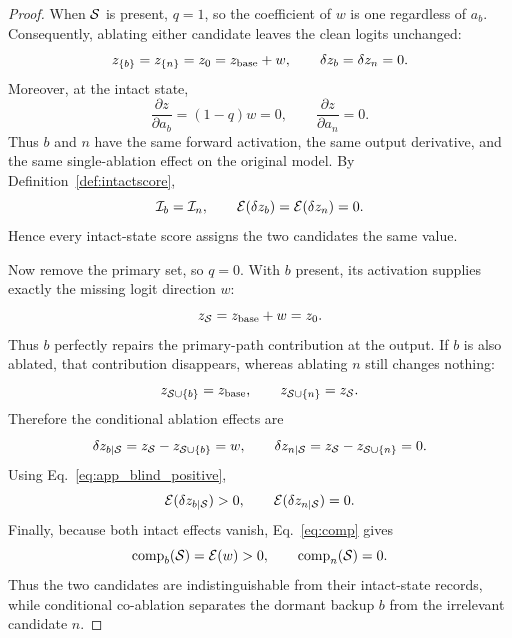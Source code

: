 \begin{proof}
When $\mathcal{S}$ is present, $q=1$, so the coefficient of $w$ is one regardless
of $a_b$.
Consequently, ablating either candidate leaves the clean logits unchanged:
\begin{equation}
z_{\{b\}}=z_{\{n\}}=z_0=z_{\mathrm{base}}+w,
\qquad
\delta z_b=\delta z_n=0 .
\label{eq:app_blind_intact}
\end{equation}
Moreover, at the intact state,
\begin{equation}
\frac{\partial z}{\partial a_b}
=
(1-q)w
=
0,
\qquad
\frac{\partial z}{\partial a_n}
=
0 .
\label{eq:app_blind_derivatives}
\end{equation}
Thus $b$ and $n$ have the same forward activation, the same output derivative,
and the same single-ablation effect on the original model.
By Definition~\ref{def:intactscore},
\begin{equation}
\mathcal{I}_b=\mathcal{I}_n,
\qquad
\mathcal{E}(\delta z_b)=\mathcal{E}(\delta z_n)=0 .
\label{eq:app_blind_same_record}
\end{equation}
Hence every intact-state score assigns the two candidates the same value.

Now remove the primary set, so $q=0$.
With $b$ present, its activation supplies exactly the missing logit direction
$w$:
\begin{equation}
z_{\mathcal{S}}=z_{\mathrm{base}}+w=z_0 .
\label{eq:app_blind_repair}
\end{equation}
Thus $b$ perfectly repairs the primary-path contribution at the output.
If $b$ is also ablated, that contribution disappears, whereas ablating $n$
still changes nothing:
\begin{equation}
z_{\mathcal{S}\cup\{b\}}=z_{\mathrm{base}},
\qquad
z_{\mathcal{S}\cup\{n\}}=z_{\mathcal{S}} .
\label{eq:app_blind_counterfactuals}
\end{equation}
Therefore the conditional ablation effects are
\begin{equation}
\delta z_{b\mid\mathcal{S}}
=
z_{\mathcal{S}}-z_{\mathcal{S}\cup\{b\}}
=
w,
\qquad
\delta z_{n\mid\mathcal{S}}
=
z_{\mathcal{S}}-z_{\mathcal{S}\cup\{n\}}
=
0 .
\label{eq:app_blind_conditional}
\end{equation}
Using Eq.~\ref{eq:app_blind_positive},
\begin{equation}
\mathcal{E}(\delta z_{b\mid\mathcal{S}})>0,
\qquad
\mathcal{E}(\delta z_{n\mid\mathcal{S}})=0 .
\label{eq:app_blind_conditional_energy}
\end{equation}
Finally, because both intact effects vanish, Eq.~\ref{eq:comp} gives
\begin{equation}
\mathrm{comp}_b(\mathcal{S})
=
\mathcal{E}(w)
>0,
\qquad
\mathrm{comp}_n(\mathcal{S})
=
0 .
\label{eq:app_blind_coax}
\end{equation}
Thus the two candidates are indistinguishable from their intact-state records,
while conditional co-ablation separates the dormant backup $b$ from the
irrelevant candidate $n$.
\end{proof}

